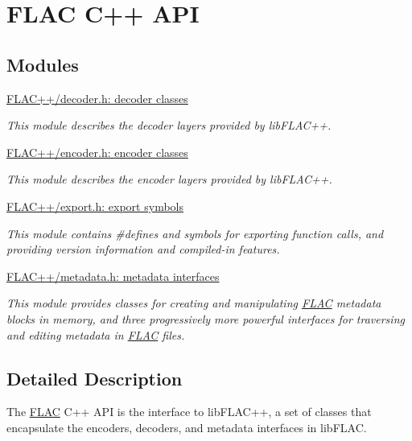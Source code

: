 \hypertarget{group__flacpp}{}\section{F\+L\+AC C++ A\+PI}
\label{group__flacpp}
\subsection*{Modules}
\begin{DoxyCompactItemize}
\item 
\hyperlink{group__flacpp__decoder}{F\+L\+A\+C++/decoder.\+h\+: decoder classes}
\begin{DoxyCompactList}\small\item\em This module describes the decoder layers provided by lib\+F\+L\+A\+C++. \end{DoxyCompactList}\item 
\hyperlink{group__flacpp__encoder}{F\+L\+A\+C++/encoder.\+h\+: encoder classes}
\begin{DoxyCompactList}\small\item\em This module describes the encoder layers provided by lib\+F\+L\+A\+C++. \end{DoxyCompactList}\item 
\hyperlink{group__flacpp__export}{F\+L\+A\+C++/export.\+h\+: export symbols}
\begin{DoxyCompactList}\small\item\em This module contains \#defines and symbols for exporting function calls, and providing version information and compiled-\/in features. \end{DoxyCompactList}\item 
\hyperlink{group__flacpp__metadata}{F\+L\+A\+C++/metadata.\+h\+: metadata interfaces}
\begin{DoxyCompactList}\small\item\em This module provides classes for creating and manipulating \hyperlink{namespace_f_l_a_c}{F\+L\+AC} metadata blocks in memory, and three progressively more powerful interfaces for traversing and editing metadata in \hyperlink{namespace_f_l_a_c}{F\+L\+AC} files. \end{DoxyCompactList}\end{DoxyCompactItemize}


\subsection{Detailed Description}
The \hyperlink{namespace_f_l_a_c}{F\+L\+AC} C++ A\+PI is the interface to lib\+F\+L\+A\+C++, a set of classes that encapsulate the encoders, decoders, and metadata interfaces in lib\+F\+L\+AC. 